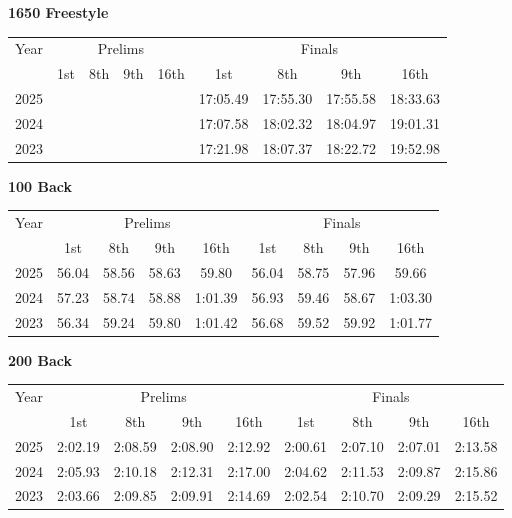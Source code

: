 \textbf{1650 Freestyle}

\begin{flushleft}
\begin{tabular}{|c|c|c|c|c|c|c|c|c|}
\hline
Year & \multicolumn{4}{c|}{Prelims} & \multicolumn{4}{c|}{Finals} \\
\cline{2-9}
& 1st & 8th & 9th & 16th & 1st & 8th & 9th & 16th \\
\hline
2025 &  &  &  &  & 17:05.49 & 17:55.30 & 17:55.58 & 18:33.63 \\
2024 &  &  &  &  & 17:07.58 & 18:02.32 & 18:04.97 & 19:01.31 \\
2023 &  &  &  &  & 17:21.98 & 18:07.37 & 18:22.72 & 19:52.98 \\
\hline
\end{tabular}
\end{flushleft}

\textbf{100 Back}

\begin{flushleft}
\begin{tabular}{|c|c|c|c|c|c|c|c|c|}
\hline
Year & \multicolumn{4}{c|}{Prelims} & \multicolumn{4}{c|}{Finals} \\
\cline{2-9}
& 1st & 8th & 9th & 16th & 1st & 8th & 9th & 16th \\
\hline
2025 & 56.04 & 58.56 & 58.63 & 59.80 & 56.04 & 58.75 & 57.96 & 59.66 \\
2024 & 57.23 & 58.74 & 58.88 & 1:01.39 & 56.93 & 59.46 & 58.67 & 1:03.30 \\
2023 & 56.34 & 59.24 & 59.80 & 1:01.42 & 56.68 & 59.52 & 59.92 & 1:01.77 \\
\hline
\end{tabular}
\end{flushleft}

\textbf{200 Back}

\begin{flushleft}
\begin{tabular}{|c|c|c|c|c|c|c|c|c|}
\hline
Year & \multicolumn{4}{c|}{Prelims} & \multicolumn{4}{c|}{Finals} \\
\cline{2-9}
& 1st & 8th & 9th & 16th & 1st & 8th & 9th & 16th \\
\hline
2025 & 2:02.19 & 2:08.59 & 2:08.90 & 2:12.92 & 2:00.61 & 2:07.10 & 2:07.01 & 2:13.58 \\
2024 & 2:05.93 & 2:10.18 & 2:12.31 & 2:17.00 & 2:04.62 & 2:11.53  & 2:09.87  & 2:15.86 \\
2023 & 2:03.66 & 2:09.85 & 2:09.91 & 2:14.69 & 2:02.54 & 2:10.70 & 2:09.29 & 2:15.52 \\
\hline
\end{tabular}
\end{flushleft}

